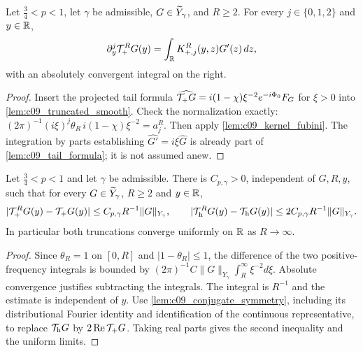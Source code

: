 \begin{lemma}
  \label{lem:c09_truncated_representation}
  Let $\frac34<p<1$, let $\gamma$ be admissible, $G\in\widetilde{Y}_\gamma$, and $R\ge2$.
  For every $j\in\{0,1,2\}$ and $y\in\mathbb{R}$,
  \[
    \partial_y^j\mathcal{T}_+^RG(y)=\int_{\mathbb{R}} K_{+,j}^R(y,z)G'(z)\,dz,
  \]
  with an absolutely convergent integral on the right.
\end{lemma}
\begin{proof}
  Insert the projected tail formula
  $\widehat{\mathcal{T}_+G}=i(1-\chi)\xi^{-2}e^{-i\Phi_0}F_G$ for $\xi>0$
  into \cref{lem:c09_truncated_smooth}. Check the normalization exactly:
  $(2\pi)^{-1}(i\xi)^j\theta_R\,i(1-\chi)\xi^{-2}=a_j^R$.
  Then apply \cref{lem:c09_kernel_fubini}. The integration by parts establishing
  $\widehat{G'}=i\xi\widehat G$ is already part of \cref{lem:c09_tail_formula}; it is not assumed anew.
\end{proof}

\begin{lemma}
  \label{lem:c09_truncation_L1_error}
  Let $\frac34<p<1$ and let $\gamma$ be admissible. There is $C_{p,\gamma}>0$, independent of $G,R,y$,
  such that for every $G\in\widetilde{Y}_\gamma$, $R\ge2$ and $y\in\mathbb{R}$,
  \[
    |\mathcal{T}_+^RG(y)-\mathcal{T}_+G(y)|\le C_{p,\gamma}R^{-1}\|G\|_{Y_\gamma},\qquad
    |\mathcal{T}_{\rm h}^RG(y)-\mathcal{T}_{\rm h}G(y)|\le2C_{p,\gamma}R^{-1}\|G\|_{Y_\gamma}.
  \]
  In particular both truncations converge uniformly on $\mathbb{R}$ as $R\to\infty$.
\end{lemma}
\begin{proof}
  Since $\theta_R=1$ on $[0,R]$ and $|1-\theta_R|\le1$, the difference of the two positive-frequency
  integrals is bounded by $(2\pi)^{-1}C\|G\|_{Y_\gamma}\int_R^\infty\xi^{-2}d\xi$.
  Absolute convergence justifies subtracting the integrals. The integral is $R^{-1}$ and the estimate
  is independent of $y$. Use \cref{lem:c09_conjugate_symmetry}, including its distributional Fourier
  identity and identification of the continuous representative, to replace $\mathcal{T}_{\rm h}G$ by
  $2\operatorname{Re}\mathcal{T}_+G$. Taking real parts gives the second inequality and the uniform limits.
\end{proof}

